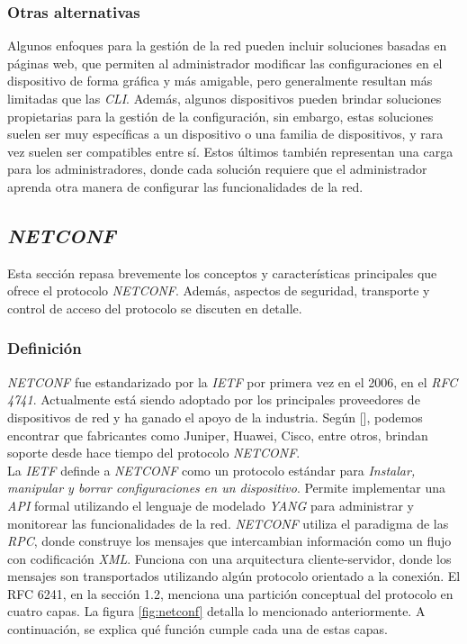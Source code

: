\subsubsection{Otras alternativas}
Algunos enfoques para la gestión de la red pueden incluir soluciones basadas en páginas web, que permiten al administrador modificar las configuraciones en el dispositivo de forma gráfica y más amigable, pero generalmente resultan más limitadas que las \textit{CLI}. 
Además, algunos dispositivos pueden brindar soluciones propietarias para la gestión de la configuración, sin embargo, estas soluciones suelen ser muy específicas a un dispositivo o una familia de dispositivos, y rara vez suelen ser compatibles entre sí. Estos últimos también representan una carga para los administradores, donde cada solución requiere que el administrador aprenda otra manera de configurar las funcionalidades de la red.  

\subsection{\textit{NETCONF}}
Esta sección repasa brevemente los conceptos y características principales que ofrece el protocolo \textit{NETCONF}. Además, aspectos de seguridad, transporte y control de acceso del protocolo se discuten en detalle. 

\subsubsection{Definición}
\textit{NETCONF} fue estandarizado por la \textit{IETF} por primera vez en el 2006, en el \textit{RFC 4741}. Actualmente está siendo adoptado por los principales proveedores de dispositivos de red y ha ganado el apoyo de la industria. Según [], podemos encontrar que fabricantes como Juniper, Huawei, Cisco, entre otros, brindan soporte desde hace tiempo del protocolo \textit{NETCONF}. 
\\

La \textit{IETF} definde a \textit{NETCONF} como un protocolo estándar para \textit{Instalar, manipular y borrar configuraciones en un dispositivo}. Permite implementar una \textit{API} formal utilizando el lenguaje de modelado \textit{YANG} para administrar y monitorear las funcionalidades de la red. \textit{NETCONF} utiliza el paradigma de las \textit{RPC}, donde construye los mensajes que intercambian información como un flujo con codificación \textit{XML}. Funciona con una arquitectura cliente-servidor, donde los mensajes son transportados utilizando algún protocolo orientado a la conexión. El RFC 6241, en la sección 1.2, menciona una partición conceptual del protocolo en cuatro capas. La figura \ref{fig:netconf} detalla lo mencionado anteriormente. A continuación, se explica qué función cumple cada una de estas capas.

